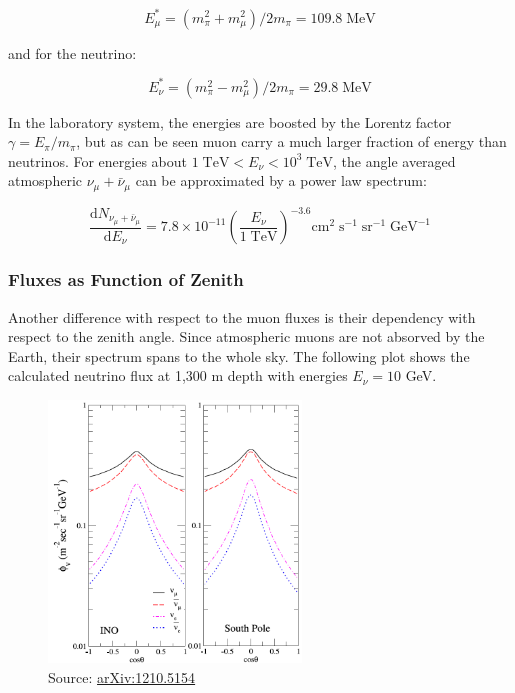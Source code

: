 \documentclass[
  letterpaper,
  DIV=11,
  numbers=noendperiod]{scrreprt}
\begin{document}
\[E_\mu^{*} = (m_\pi^2 + m_\mu^2)/2m_\pi = 109.8\;\mathrm{MeV}\]

and for the neutrino:

\[E_\nu^{*} = (m_\pi^2 - m_\mu^2)/2m_\pi = 29.8\;\mathrm{MeV}\]

In the laboratory system, the energies are boosted by the Lorentz factor
\(\gamma= E_\pi /m_\pi\), but as can be seen muon carry a much larger
fraction of energy than neutrinos. For energies about
\(1\;\mathrm{TeV}< E_\nu <  10^3\;\mathrm{TeV}\), the angle averaged
atmospheric \(\nu_\mu + {\bar \nu_\mu}\) can be approximated by a power
law spectrum:

\[\frac{\mathrm{d}N_{\nu_\mu + {\bar \nu_\mu}}}{\mathrm{d}E_\nu} = 7.8 \times 10^{-11}\left(\frac{E_\nu}{1\;\mathrm{TeV}}\right)^{-3.6}\mathrm{cm^2\;s^{-1}\;sr^{-1}\;GeV^{-1}}\]

\subsubsection{Fluxes as Function of
Zenith}\label{fluxes-as-function-of-zenith}

Another difference with respect to the muon fluxes is their dependency
with respect to the zenith angle. Since atmospheric muons are not
absorved by the Earth, their spectrum spans to the whole sky. The
following plot shows the calculated neutrino flux at 1,300 m depth with
energies \(E_\nu = 10\) GeV.

\begin{figure}[H]

{\centering \includegraphics[width=0.6\textwidth,height=\textheight]{images/nu_zenith.png}

}

\caption{Source: \href{http://arxiv.org/abs/1210.5154}{arXiv:1210.5154}}

\end{figure}%
\end{document}
